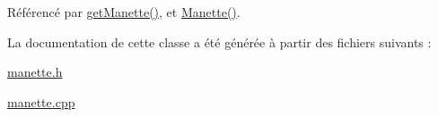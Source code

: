 Référencé par \hyperlink{class_manette_a708eccb66e967e0fe575b19e9899ff5a}{get\+Manette()}, et \hyperlink{class_manette_a9a7b00a30cd6a7eea503c8bcfe5bbcbb}{Manette()}.



La documentation de cette classe a été générée à partir des fichiers suivants \+:\begin{DoxyCompactItemize}
\item 
\hyperlink{manette_8h}{manette.\+h}\item 
\hyperlink{manette_8cpp}{manette.\+cpp}\end{DoxyCompactItemize}
